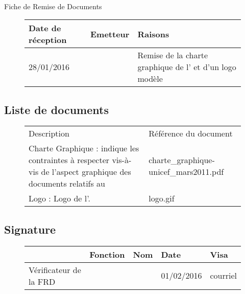 \documentclass[asi, sansVersion]{picINSA}
\begin{document}
\begin{center}
\huge
\nomEquipe{}\\
Fiche de Remise de Documents\\
\end{center}
\vspace{0.5cm}


\begin{figure}[H]
		\centering
		\begin{tabularx}{17cm}{|p{4cm}|X|X|}
		\hline
		\rowcolor[gray]{0.85}Date de réception & Emetteur & Raisons \\
		\hline
		28/01/2016 & \nomClient{} & Remise de la charte graphique de l'\nomClient{} et d'un logo modèle\\
		\hline
		\end{tabularx}
\end{figure}

\subsection*{Liste de documents}

\begin{figure}[H]
		\centering
		\begin{tabularx}{17cm}{|p{7cm}|X|}
		\hline
		\rowcolor[gray]{0.85} Description & Référence du document \\
		Charte Graphique : indique les contraintes à respecter vis-à-vis de l'aspect graphique des documents relatifs au \Client{} & charte\_graphique-unicef\_mars2011.pdf \\
		\hline
		Logo \nomClient{} : Logo de l'\nomClient. & logo.gif\\
		\hline
		\end{tabularx}
\end{figure}

\subsection*{Signature}

\begin{figure}[H]
		\centering
		\begin{tabularx}{17cm}{|p{4cm}|X|X|X|X|}
		\hline
		\rowcolor[gray]{0.85}& Fonction & Nom & Date & Visa \\
		\hline
		 Vérificateur de la FRD & \RGC & \Mathieu & 01/02/2016 & courriel \\
		\hline
		\end{tabularx}
\end{figure}
\end{document}
